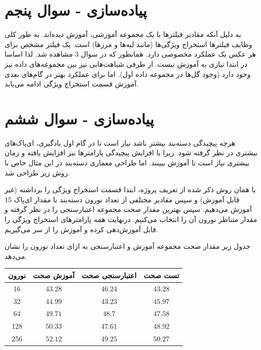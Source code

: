\documentclass{article}
\begin{document}
\section{پیاده‌سازی - سوال پنجم}

به دلیل آنکه مقادیر فیلتر‌ها با یک مجموعه آموزشی، آموزش دیده‌اند. به طور کلی وظایف فیلترها استخراج ویژگی‌ها (مانند لبه‌ها و مرزها) است. یک فیلتر مشخص برای هر عکس یک عملکرد مخصوصی دارد. همانطور که در سوال 3 مشاهده شد. لذا اساسا در ابتدا نیازی به آموزش نیست. از طرفی شباهت‌هایی نیز بین مجموعه‌های داده نیز وجود دارد (وجود گل‌ها در مجموعه داده اول). اما برای عملکرد بهتر در گام‌های بعدی آموزش قسمت استخراج ویژگی ادامه می‌یابد.

\section{پیاده‌سازی - سوال ششم}

هرچه پیچیدگی دسته‌بند بیشتر باشد نیاز است تا در گام اول یادگیری، ای‌پاک‌های بیشتری در نظر گرفته شود. زیرا با افزایش پیچیدگی پارامترها نیز افزایش یافته و زمان بیشتری نیاز است تا آموزش ببینند. اما طراحی معماری دسته‌بند در این مثال خاص با روش زیر طراحی شد.

با همان روش ذکر شده از تعریف پروژه، ابتدا قسمت استخراج ویژگی را برداشته (غیر قابل آموزش) و سپس مقادیر مختلفی از تعداد نورون دسته‌بند با مقدار ای‌پاک 15 آموزش می‌دهیم. سپس بهترین مقدار صحت مجموعه اعتبارسنجی را در نظر گرفته و مقدار متناظر نورون آن را انتخاب می‌کنیم. درنهایت همه پارامترهای استخراج ویژگی را قابل آموزش‌دهی کرده و آموزش را از سر می‌گیریم.


جدول زیر مقدار صحت مجموعه آموزش و اعتبارسنجی به ازای تعداد نورون را نشان می‌دهد.

\begin{table}[h!]
    \centering
    \begin{tabular}{|c|c|c|c|}
    \hline
    نورون & آموزش صحت & اعتبارسنجی صحت & تست صحت\\ \hline
    16 & $43.28$ & $46.24$ & $43.28$\\ \hline
    32 & $44.99$ & $43.23$ & $45.97$\\ \hline
    64 & $49.71$ & $48.7$ & $47.58$\\ \hline
    128 & $50.33$ & $47.61$ & $48.92$\\ \hline
    256 & $52.12$ & $49.25$ & $50.27$\\ \hline
    \end{tabular}
    \end{table}
\end{document}
